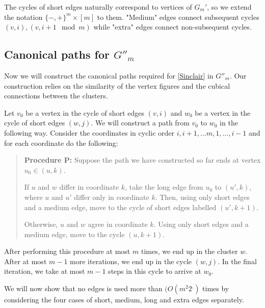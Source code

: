 The cycles of short edges naturally correspond to vertices of $G_m'$, so we extend the notation $\{-,+\}^m \times [m]$ to them. "Medium" edges connect subsequent cycles $(v,i), (v,i+1 \mod m)$ while "extra" edges connect non-subsequent cycles. 

\subsection{Canonical paths for $G''_m$}
\label{canpaths}

Now we will construct the canonical paths required for \ref{Sinclair} in $G''_m$. Our construction relies on the similarity
of the vertex figures and the cubical connections between the clusters. 

Let $v_0$ be a vertex in the cycle of short edges $(v,i)$ and $w_0$ be a vertex in the cycle of short edges $(w,j)$. 
We will construct a path from $v_0$ to $w_0$ in the following way. Consider the coordinates in cyclic order $i, i+1, \dots m, 1, \dots,
i-1$ and for each coordinate do the following:

\begin{quote}
\textbf{Procedure P:}
Suppose the path we have constructed so far ends at vertex $u_0 \in (u,k)$.
\begin{compactitem}
\item If $u$ and $w$ differ in coordinate $k$, take the long edge from $u_0$ to $(u',k)$,
where $u$ and $u'$ differ only in coordinate $k$. Then, using only short edges and a medium edge,
move to the cycle of short edges labelled $(u', k+1)$.
\item Otherwise, $u$ and $w$ agree in coordinate $k$. Using only short edges and a medium edge,
move to the cycle $(u, k+1)$.
\end{compactitem}
\end{quote}

After performing this procedure at most $m$ times, we end up in the cluster $w$. After at most $m-1$ more
iterations, we end up in the cycle $(w,j)$. In the final iteration, we take at most $m-1$ steps in this cycle to arrive
at $w_0$.

We will now show that no edges is used more than $(O(m^2 2^,)$ times by considering the four cases of short, medium, long
and extra edges separately.


